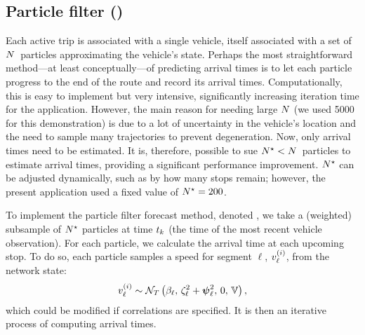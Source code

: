 \subsection{Particle filter (\Fpf{})}
\label{sec:prediction_arrival_time_pf}
Each active trip is associated with a single vehicle, itself associated with a set of  $N$~particles approximating the vehicle's state. Perhaps the most straightforward method---at least conceptually---of predicting arrival times is to let each particle progress to the end of the route and record its arrival times. Computationally, this is easy to implement but very intensive, significantly increasing iteration time for the application. However, the main reason for needing large $N$ (we used 5000 for this demonstration) is due to a lot of uncertainty in the vehicle's location and the need to sample many trajectories to prevent degeneration. Now, only arrival times need to be estimated. It is, therefore, possible to sue $N^\star < N$~particles to estimate arrival times, providing a significant performance improvement. $N^\star$ can be adjusted dynamically, such as by how many stops remain; however, the present application used a fixed value of $N^\star = 200$.


To implement the particle filter forecast method, denoted \Fpf{}, we take a (weighted) subsample of $N^\star$ particles at time $t_k$ (the time of the most recent vehicle observation). For each particle, we calculate the arrival time at each upcoming stop. To do so, each particle samples a speed for segment $\ell$, $v^{(i)}_\ell$, from the network state:
\begin{equation}
\label{eq:pred_seg_speed}
v^{(i)}_\ell \sim \mathcal{N}_T\left(\beta_\ell,\, \zeta_\ell^2 + \mathbf{\boldsymbol{\psi}}_\ell^2,\, 0,\, \mathbb{V}\right),
\end{equation}
which could be modified if correlations are specified. It is then an iterative process of computing arrival times.

